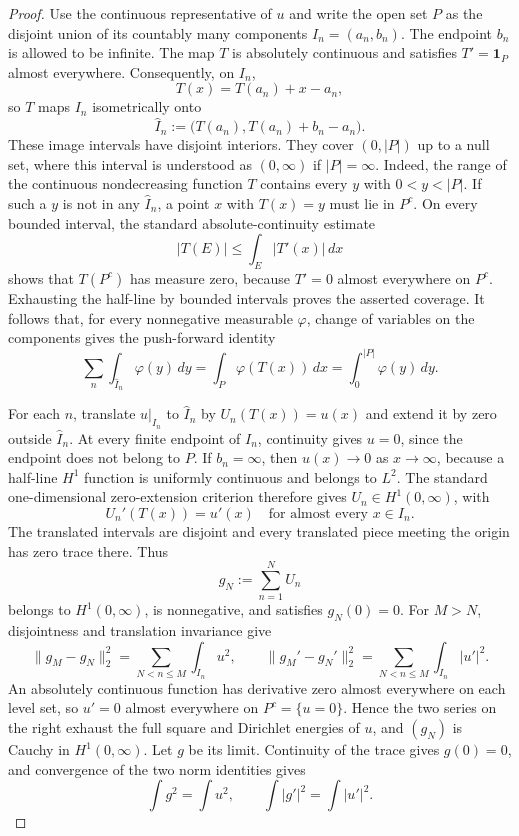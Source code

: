 \documentclass[11pt]{article}
\theoremstyle{definition}
\theoremstyle{remark}
\begin{document}
\begin{proof}
Use the continuous representative of $u$ and write the open set $P$ as the
disjoint union of its countably many components $I_n=(a_n,b_n)$. The endpoint
$b_n$ is allowed to be infinite. The map $T$ is absolutely continuous and
satisfies $T'=\mathbf1_P$ almost everywhere. Consequently, on $I_n$,
\[
 T(x)=T(a_n)+x-a_n,
\]
so $T$ maps $I_n$ isometrically onto
\[
 \widehat I_n:=\bigl(T(a_n),T(a_n)+b_n-a_n\bigr).
\]
These image intervals have disjoint interiors. They cover $(0,|P|)$ up to a
null set, where this interval is understood as $(0,\infty)$ if $|P|=\infty$.
Indeed, the range of the continuous nondecreasing function $T$ contains every
$y$ with $0<y<|P|$. If such a $y$ is not in any $\widehat I_n$, a point
$x$ with $T(x)=y$ must lie in $P^c$. On every bounded interval, the standard
absolute-continuity estimate
\[
 |T(E)|\leq\int_E|T'(x)|\,dx
\]
shows that $T(P^c)$ has measure zero, because $T'=0$ almost everywhere on
$P^c$. Exhausting the half-line by bounded intervals proves the asserted
coverage. It follows that, for every nonnegative measurable $\varphi$,
change of variables on the components gives the push-forward identity
\[
 \sum_n\int_{\widehat I_n}\varphi(y)\,dy
 =\int_P\varphi(T(x))\,dx
 =\int_0^{|P|}\varphi(y)\,dy.
\]

For each $n$, translate $u|_{I_n}$ to $\widehat I_n$ by
$U_n(T(x))=u(x)$ and extend it by zero outside $\widehat I_n$. At every finite
endpoint of $I_n$, continuity gives $u=0$, since the endpoint does not belong
to $P$. If $b_n=\infty$, then $u(x)\to0$ as $x\to\infty$, because a half-line
$H^1$ function is uniformly continuous and belongs to $L^2$. The standard
one-dimensional zero-extension criterion therefore gives
$U_n\in H^1(0,\infty)$, with
\[
 U_n'(T(x))=u'(x)\quad\text{for almost every }x\in I_n.
\]
The translated intervals are disjoint and every translated piece meeting the
origin has zero trace there. Thus
\[
 g_N:=\sum_{n=1}^N U_n
\]
belongs to $H^1(0,\infty)$, is nonnegative, and satisfies $g_N(0)=0$. For
$M>N$, disjointness and translation invariance give
\[
 \|g_M-g_N\|_2^2=\sum_{N<n\leq M}\int_{I_n}u^2,
 \qquad
 \|g_M'-g_N'\|_2^2=\sum_{N<n\leq M}\int_{I_n}|u'|^2.
\]
An absolutely continuous function has derivative zero almost everywhere on
each level set, so $u'=0$ almost everywhere on $P^c=\{u=0\}$. Hence the two
series on the right exhaust the full square and Dirichlet energies of $u$, and
$(g_N)$ is Cauchy in $H^1(0,\infty)$. Let $g$ be its limit. Continuity of the
trace gives $g(0)=0$, and convergence of the two norm identities gives
\[
 \int g^2=\int u^2,
 \qquad
 \int|g'|^2=\int|u'|^2.
\]


\end{proof}
\end{document}
